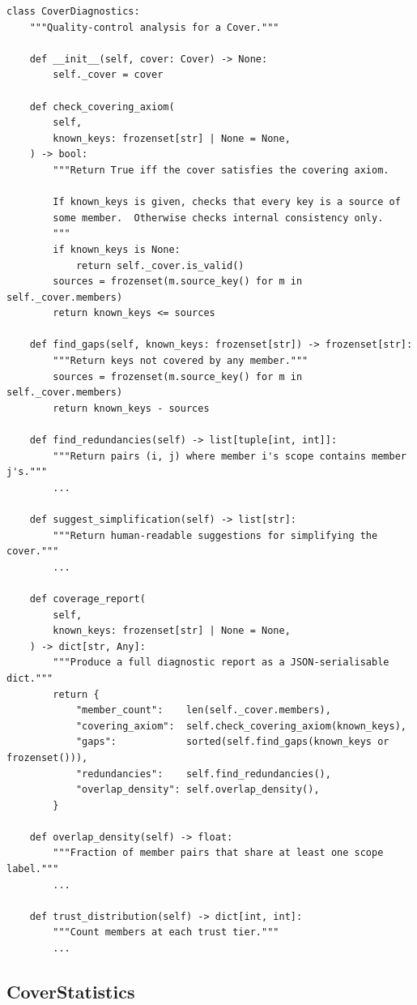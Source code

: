 \documentclass[11pt]{article}
\begin{document}
\begin{lstlisting}[style=jugeo-python,
  caption={\texttt{CoverDiagnostics} from \texttt{src/jugeo/geometry/covers.py}.},
  label={lst:diag}]
class CoverDiagnostics:
    """Quality-control analysis for a Cover."""

    def __init__(self, cover: Cover) -> None:
        self._cover = cover

    def check_covering_axiom(
        self,
        known_keys: frozenset[str] | None = None,
    ) -> bool:
        """Return True iff the cover satisfies the covering axiom.

        If known_keys is given, checks that every key is a source of
        some member.  Otherwise checks internal consistency only.
        """
        if known_keys is None:
            return self._cover.is_valid()
        sources = frozenset(m.source_key() for m in self._cover.members)
        return known_keys <= sources

    def find_gaps(self, known_keys: frozenset[str]) -> frozenset[str]:
        """Return keys not covered by any member."""
        sources = frozenset(m.source_key() for m in self._cover.members)
        return known_keys - sources

    def find_redundancies(self) -> list[tuple[int, int]]:
        """Return pairs (i, j) where member i's scope contains member j's."""
        ...

    def suggest_simplification(self) -> list[str]:
        """Return human-readable suggestions for simplifying the cover."""
        ...

    def coverage_report(
        self,
        known_keys: frozenset[str] | None = None,
    ) -> dict[str, Any]:
        """Produce a full diagnostic report as a JSON-serialisable dict."""
        return {
            "member_count":    len(self._cover.members),
            "covering_axiom":  self.check_covering_axiom(known_keys),
            "gaps":            sorted(self.find_gaps(known_keys or frozenset())),
            "redundancies":    self.find_redundancies(),
            "overlap_density": self.overlap_density(),
        }

    def overlap_density(self) -> float:
        """Fraction of member pairs that share at least one scope label."""
        ...

    def trust_distribution(self) -> dict[int, int]:
        """Count members at each trust tier."""
        ...
\end{lstlisting}

\subsection{CoverStatistics}
\end{document}
